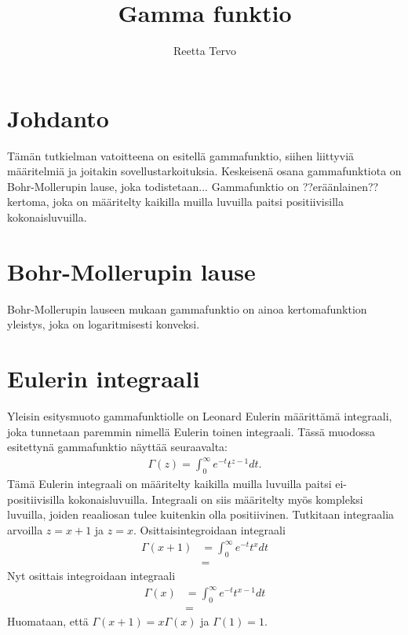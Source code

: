 \documentclass[12pt]{article}
\title{Gamma funktio}
\author{Reetta Tervo}
\begin{document}
\maketitle

\newpage
\tableofcontents

\newpage
\section{Johdanto}
\onehalfspacing
Tämän tutkielman vatoitteena on esitellä gammafunktio, siihen liittyviä määritelmiä ja joitakin sovellustarkoituksia. Keskeisenä osana gammafunktiota on Bohr-Mollerupin lause, joka todistetaan...
\newline
Gammafunktio on ??eräänlainen?? kertoma, joka on määritelty kaikilla muilla luvuilla paitsi positiivisilla kokonaisluvuilla. 
\newpage
\section{Bohr-Mollerupin lause}
Bohr-Mollerupin lauseen mukaan gammafunktio on ainoa kertomafunktion yleistys, joka on logaritmisesti konveksi. 
\newpage


\section{Eulerin integraali}
Yleisin esitysmuoto gammafunktiolle on Leonard Eulerin määrittämä integraali, joka tunnetaan paremmin nimellä Eulerin toinen integraali. Tässä muodossa esitettynä gammafunktio näyttää seuraavalta:
\begin{align*}
    \Gamma(z) = \int_{0}^{\infty} e^{-t} t^{z-1} dt.
\end{align*}
Tämä Eulerin integraali on määritelty kaikilla muilla luvuilla paitsi ei-positiivisilla kokonaisluvuilla. Integraali on siis määritelty myös kompleksi luvuilla, joiden reaaliosan tulee kuitenkin olla positiivinen. \newline
Tutkitaan integraalia arvoilla $z=x+1$ ja $z=x$. \newline
Osittaisintegroidaan integraali
\begin{align*}
    \Gamma(x+1) & = \int_{0}^{\infty} e^{-t} t^{x} dt \\
    & = 
\end{align*}
Nyt osittais integroidaan integraali \newline
\begin{align*}
    \Gamma(x) & = \int_{0}^{\infty} e^{-t} t^{x-1} dt \\
& =
\end{align*}
Huomataan, että $\Gamma(x+1) = x\Gamma(x)$ ja $\Gamma(1) = 1.$ \newline
\newpage
\end{document}
